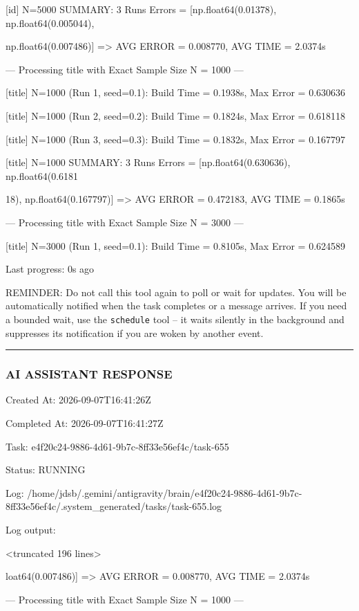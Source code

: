 \documentclass[11pt,a4paper]{article}
\begin{document}
[id] N=5000 SUMMARY: 3 Runs Errors = [np.float64(0.01378), np.float64(0.005044),

np.float64(0.007486)] => AVG ERROR = 0.008770, AVG TIME = 2.0374s


--- Processing title with Exact Sample Size N = 1000 ---

[title] N=1000 (Run 1, seed=0.1): Build Time = 0.1938s, Max Error = 0.630636

[title] N=1000 (Run 2, seed=0.2): Build Time = 0.1824s, Max Error = 0.618118

[title] N=1000 (Run 3, seed=0.3): Build Time = 0.1832s, Max Error = 0.167797

[title] N=1000 SUMMARY: 3 Runs Errors = [np.float64(0.630636), np.float64(0.6181

18), np.float64(0.167797)] => AVG ERROR = 0.472183, AVG TIME = 0.1865s

--- Processing title with Exact Sample Size N = 3000 ---

[title] N=3000 (Run 1, seed=0.1): Build Time = 0.8105s, Max Error = 0.624589


Last progress: 0s ago



REMINDER: Do not call this tool again to poll or wait for updates. You will be automatically notified when the task completes or a message arrives. If you need a bounded wait, use the \texttt{schedule} tool -- it waits silently in the background and suppresses its notification if you are woken by another event.


\hrule

\subsubsection{AI ASSISTANT RESPONSE}

Created At: 2026-09-07T16:41:26Z

Completed At: 2026-09-07T16:41:27Z

Task: e4f20c24-9886-4d61-9b7c-8ff33e56ef4c/task-655

Status: RUNNING

Log: /home/jdsb/.gemini/antigravity/brain/e4f20c24-9886-4d61-9b7c-8ff33e56ef4c/.system\_generated/tasks/task-655.log

Log output:

<truncated 196 lines>

loat64(0.007486)] => AVG ERROR = 0.008770, AVG TIME = 2.0374s


--- Processing title with Exact Sample Size N = 1000 ---
\end{document}
